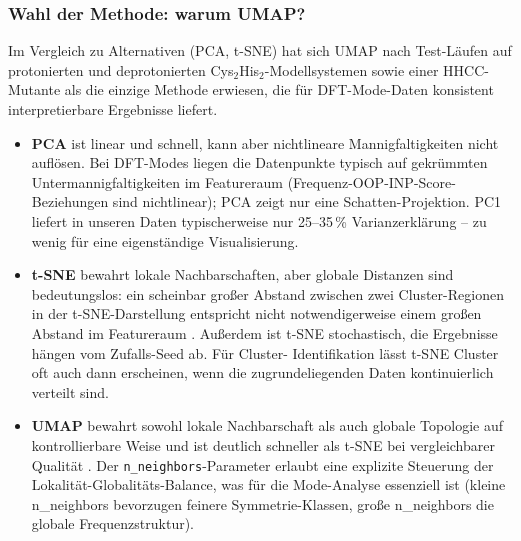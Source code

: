 \documentclass[11pt,a4paper,twoside]{article}
\theoremstyle{remark}
\begin{document}
\subsubsection*{Wahl der Methode: warum UMAP?}

Im Vergleich zu Alternativen (PCA, t-SNE) hat sich UMAP nach
Test-L\"aufen auf protonierten und deprotonierten
Cys$_2$His$_2$-Modellsystemen sowie einer HHCC-Mutante als die
einzige Methode erwiesen, die f\"ur DFT-Mode-Daten konsistent
interpretierbare Ergebnisse liefert.

\begin{itemize}
  \item \textbf{PCA} \cite{Pearson1901,Hotelling1933,Jolliffe2002} ist
        linear und schnell, kann aber nichtlineare Mannigfaltigkeiten
        nicht aufl\"osen. Bei DFT-Modes liegen die Datenpunkte typisch
        auf gekr\"ummten Untermannigfaltigkeiten im Featureraum
        (Frequenz-OOP-INP-Score-Beziehungen sind nichtlinear); PCA
        zeigt nur eine Schatten-Projektion. PC1 liefert in unseren
        Daten typischerweise nur 25--35\,\% Varianzerkl\"arung -- zu
        wenig f\"ur eine eigenst\"andige Visualisierung.

  \item \textbf{t-SNE} \cite{vanDerMaaten2008,vanDerMaaten2014} bewahrt
        lokale Nachbarschaften, aber globale Distanzen sind
        bedeutungslos: ein scheinbar gro\ss er Abstand zwischen zwei
        Cluster-Regionen in der t-SNE-Darstellung entspricht nicht
        notwendigerweise einem gro\ss en Abstand im Featureraum
        \cite{vanDerMaaten2008}. Au\ss erdem ist t-SNE stochastisch,
        die Ergebnisse h\"angen vom Zufalls-Seed ab. F\"ur Cluster-
        Identifikation l\"asst t-SNE Cluster oft auch dann erscheinen,
        wenn die zugrundeliegenden Daten kontinuierlich verteilt sind.

  \item \textbf{UMAP} \cite{McInnes2018,Becht2019} bewahrt sowohl
        lokale Nachbarschaft als auch globale Topologie auf
        kontrollierbare Weise und ist deutlich schneller als t-SNE
        bei vergleichbarer Qualit\"at \cite{Becht2019}. Der
        \texttt{n\_neighbors}-Parameter erlaubt eine explizite
        Steuerung der Lokalit\"at-Globalit\"ats-Balance, was f\"ur die
        Mode-Analyse essenziell ist (kleine n\_neighbors bevorzugen
        feinere Symmetrie-Klassen, gro\ss e n\_neighbors die globale
        Frequenzstruktur).
\end{itemize}
\end{document}
